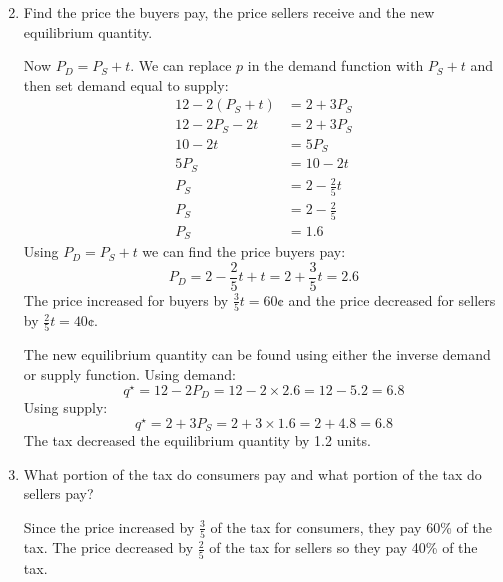 \documentclass[12pt]{article}
\newcounter{question}[section]
\newenvironment{subquestions}{
  \begin{enumerate}[label=(\roman*)]}{\end{enumerate}}
\begin{document}
\begin{subquestions}
  \setcounter{enumi}{1}
  \item Find the price the buyers pay, the price sellers receive and the new
    equilibrium quantity.

    \textcolor{solution-color}{
      Now $P_D=P_S+t$. We can replace $p$ in the demand function with $P_S+t$
      and then set demand equal to supply:
      \begin{align*}
        12 - 2\left( P_S+t \right) &= 2+ 3P_S \\
        12 - 2P_S -2t &= 2 + 3P_S \\
        10  -2t &=  5P_S \\
        5P_S &= 10 - 2t \\
        P_S &= 2 - \frac{2}{5}t \\
        P_S &= 2 - \frac{2}{5}\\
        P_S &= 1.6
      \end{align*}
      Using $P_D=P_S+t$ we can find the price buyers pay:
      \[
        P_D=2 - \frac{2}{5}t + t = 2 +\frac{3}{5}t = 2.6
      \]
      The price increased for buyers by $\frac{3}{5}t=60\cent$ and the price
      decreased for sellers by $\frac{2}{5}t=40\cent$.
    }

    \textcolor{solution-color}{
      The new equilibrium quantity can be found using either the inverse demand
      or supply function. Using demand:
      \[
        q^\star = 12 - 2P_D = 12 - 2 \times 2.6 = 12 - 5.2 = 6.8
      \]
      Using supply:
      \[
        q^\star = 2 + 3P_S = 2 + 3 \times 1.6 = 2 + 4.8 = 6.8
      \]
      The tax decreased the equilibrium quantity by 1.2 units.
    }
  \item What portion of the tax do consumers pay and what portion of the tax do
    sellers pay?

    \textcolor{solution-color}{
      Since the price increased by $\frac{3}{5}$ of the tax for consumers, they
      pay 60\% of the tax. The price decreased by $\frac{2}{5}$ of the tax for
      sellers so they pay 40\% of the tax.
    }
\end{subquestions}
\end{document}
